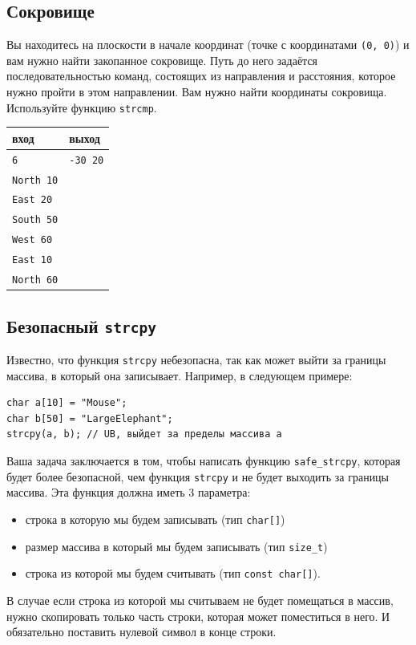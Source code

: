 \documentclass{article}
\begin{document}
\subsection{Сокровище}
Вы находитесь на плоскости в начале координат (точке с координатами \texttt{(0, 0)}) и вам нужно найти закопанное сокровище. Путь до него задаётся последовательностью команд, состоящих из направления и расстояния, которое нужно пройти в этом направлении. Вам нужно найти координаты сокровища. Используйте функцию \texttt{strcmp}.
\begin{center} 
\begin{tabular}{ l | l }
 вход & выход \\ \hline
 \texttt{6} & \texttt{-30 20}\\
 \texttt{North 10} & \\
 \texttt{East 20} &\\
 \texttt{South 50} &\\
 \texttt{West 60} &\\
 \texttt{East 10} &\\
 \texttt{North 60} &\\
\end{tabular}
\end{center}


\subsection{Безопасный \texttt{strcpy}}
Известно, что функция \texttt{strcpy} небезопасна, так как может выйти за границы массива, в который она записывает.
Например, в следующем примере:
\begin{lstlisting}
char a[10] = "Mouse";
char b[50] = "LargeElephant";
strcpy(a, b); // UB, выйдет за пределы массива a
\end{lstlisting}
Ваша задача заключается в том, чтобы написать функцию \texttt{safe\_strcpy}, которая будет более безопасной, чем функция \texttt{strcpy} и не будет выходить за границы массива. Эта функция должна иметь 3 параметра:
\begin{itemize}
\item строка в которую мы будем записывать (тип \texttt{char[]})
\item размер массива в который мы будем записывать (тип \texttt{size\_t})
\item строка из которой мы будем считывать (тип \texttt{const char[]}).
\end{itemize}
В случае если строка из которой мы считываем не будет помещаться в массив, нужно скопировать только часть строки, которая может поместиться в него. И обязательно поставить нулевой символ в конце строки.
\end{document}
